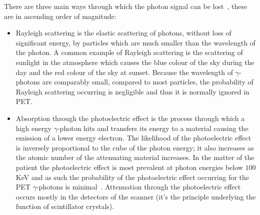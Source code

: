                 There are three main ways through which the photon signal can be lost~\parencite{scienceofpetspringer}, these are in ascending order of magnitude:
                
                \begin{itemize}
                    
                    \item Rayleigh scattering is the elastic scattering of photons, without loss of significant energy, by particles which are much smaller than the wavelength of the photon. A common example of Rayleigh scattering is the scattering of sunlight in the atmosphere which causes the blue colour of the sky during the day and the red colour of the sky at sunset. Because the wavelength of $\gamma$-photons are comparably small, compared to most particles, the probability of Rayleigh scattering occurring is negligible and thus it is normally ignored in \gls{PET}.
                    
                    \item Absorption through the photoelectric effect is the process through which a high energy $\gamma$-photon hits and transfers its energy to a material causing the emission of a lower energy electron. The likelihood of the photoelectric effect is inversely proportional to the cube of the photon energy; it also increases as the atomic number of the attenuating material increases. In the matter of the patient the photoelectric effect is most prevalent at photon energies below $100$ \gls{KeV} and as such the probability of the photoelectric effect occurring for the \gls{PET} $\gamma$-photons is minimal~\parencite{petspringer}. %
                    Attenuation through the photoelectric effect occurs mostly in the detectors of the scanner (it's the principle underlying the function of scintillator crystals).
                    

\end{itemize}
